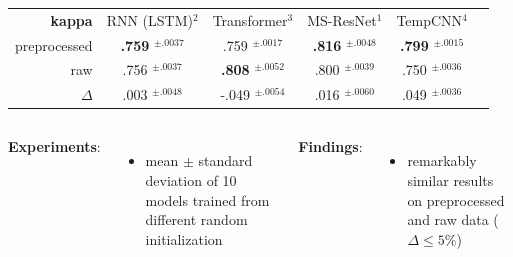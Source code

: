 \begin{frame}
{\begin{tabular}{rccccc}
	\toprule
	\textbf{kappa} & RNN (LSTM)$^2$ & Transformer$^3$ & MS-ResNet$^1$ & TempCNN$^4$ \\
	\cmidrule(lr){2-2}\cmidrule(lr){3-3} \cmidrule(lr){4-4}\cmidrule(lr){5-5}
	preprocessed & \textbf{.759} $^{\pm .0037}$ & .759 $^{\pm .0017}$ & \textbf{.816} $^{\pm .0048}$ & \textbf{.799} $^{\pm .0015}$ \\
	raw & .756 $^{\pm .0037}$ & \textbf{.808} $^{\pm .0052}$ & .800 $^{\pm .0039}$ & .750 $^{\pm .0036}$ \\
	\midrule
	$\Delta$ & .003 $^{\pm .0048}$ & -.049 $^{\pm .0054}$ & .016 $^{\pm .0060}$ & .049 $^{\pm .0036}$ \\
	
	\bottomrule
\end{tabular}

}
\vspace{1em}

\begin{columns}[t]
	
	\textbf{Experiments}:
	\begin{itemize}
		\item mean $\pm$ standard deviation of 10 models trained from different random initialization
	\end{itemize}
	
	
	\textbf{Findings}:
	\begin{itemize}
		\item remarkably similar results on preprocessed and raw data ($\Delta \leq 5\%$)
	\end{itemize}
	

\end{columns}


\end{frame}
